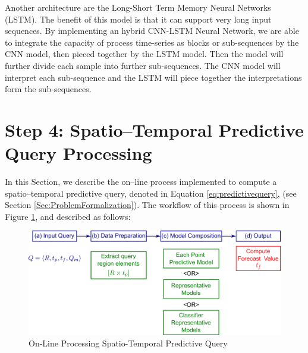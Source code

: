 Another architecture are the Long-Short Term Memory Neural Networks (LSTM). The benefit of this model is that it can support very long input sequences. By implementing an hybrid CNN-LSTM Neural Network, we are able to integrate the capacity of process time-series as blocks or sub-sequences by the CNN model, then pieced together by the LSTM model. Then the model will further divide each sample into further sub-sequences. The CNN model will interpret each sub-sequence and the LSTM will piece together the interpretations form the sub-sequences. 


\section{Step 4: Spatio--Temporal Predictive Query Processing}
\label{Sec:SpatioTemporalQueryProcessing}	

In this Section, we describe the on--line process implemented to compute a spatio--temporal predictive query, denoted in Equation \ref{eq:predictivequery}, (see Section \ref{Sec:ProblemFormalization}). The workflow of this process is shown in Figure \ref{Fig:OnLineQP}, and described as follows: 

\begin{figure}[h]
	\centering
	\includegraphics[scale=0.35]{../Figures/Query_Processing}
	\caption{On-Line Processing Spatio-Temporal Predictive Query}
	\label{Fig:OnLineQP}
\end{figure}

